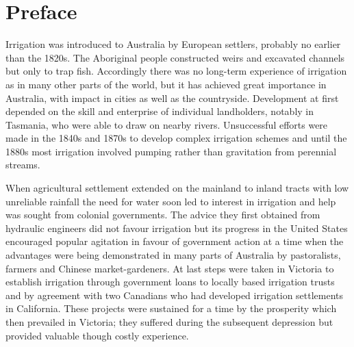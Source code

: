 
\chapter{Preface}

\label{ch:intro}

\setcounter{endnote}{0}




Irrigation was introduced to Australia by European settlers, probably
no earlier than the 1820s.  The Aboriginal people constructed weirs
and excavated channels but only to trap fish.  Accordingly there was
no long-term experience of irrigation as in many other parts of the
world, but it has achieved great importance in Australia, with impact
in cities as well as the countryside.  Development at first depended
on the skill and enterprise of individual landholders, notably in
Tasmania, who were able to draw on nearby rivers.  Unsuccessful
efforts were made in the 1840s and 1870s to develop complex irrigation
schemes and until the 1880s most irrigation involved pumping rather
than gravitation from perennial streams.

When agricultural settlement extended on the mainland to inland tracts
with low unreliable rainfall the need for water soon led to interest
in irrigation and help was sought from colonial governments.  The
advice they first obtained from hydraulic engineers did not favour
irrigation but its progress in the United States encouraged popular
agitation in favour of government action at a time when the advantages
were being demonstrated in many parts of Australia by pastoralists,
farmers and Chinese market-gardeners.  At last steps
were taken in Victoria to establish irrigation through government
loans to locally based irrigation trusts and by agreement with two
Canadians who had developed irrigation settlements in California.
These projects were sustained for a time by the prosperity which then
prevailed in Victoria; they suffered during the subsequent depression
but provided valuable though costly experience.

